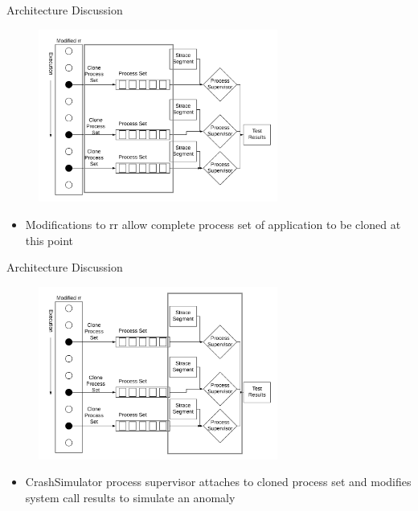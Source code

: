 \documentclass[pdf]{beamer}
\begin{document}
\begin{frame}{Architecture Discussion}
  \begin{figure}
    \centering
    \includegraphics[width = 0.7\textwidth]{images/architecture_process_sets}
  \end{figure}
  \begin{itemize}
    \item{Modifications to rr allow complete process set of application to
      be cloned at this point}
  \end{itemize}
\end{frame}


\begin{frame}{Architecture Discussion}
  \begin{figure}
    \centering
    \includegraphics[width = 0.7\textwidth]{images/architecture_mutator_supervisor}
  \end{figure}
  \begin{itemize}
    \item{CrashSimulator process supervisor attaches to cloned process set
      and modifies system call results to simulate an anomaly}
  \end{itemize}
\end{frame}
\end{document}

